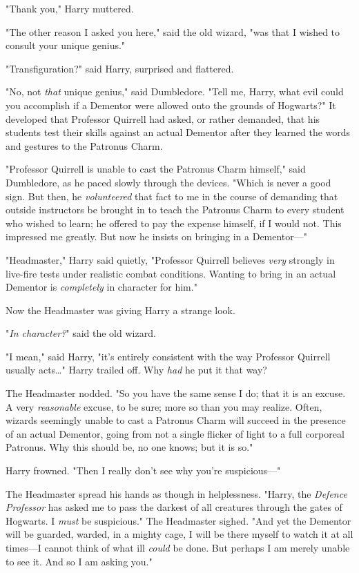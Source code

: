 "Thank you," Harry muttered.

"The other reason I asked you here," said the old wizard, "was that I wished to
consult your unique genius."

"Transfiguration?" said Harry, surprised and flattered.

"No, not \emph{that} unique genius," said Dumbledore. "Tell me, Harry, what
evil could you accomplish if a Dementor were allowed onto the grounds of
Hogwarts?"
\later
It developed that Professor Quirrell had asked, or rather demanded, that his
students test their skills against an actual Dementor after they learned the
words and gestures to the Patronus Charm.

"Professor Quirrell is unable to cast the Patronus Charm himself," said
Dumbledore, as he paced slowly through the devices. "Which is never a good
sign. But then, he \emph{volunteered} that fact to me in the course of
demanding that outside instructors be brought in to teach the Patronus Charm to
every student who wished to learn; he offered to pay the expense himself, if I
would not. This impressed me greatly. But now he insists on bringing in a
Dementor—"

"Headmaster," Harry said quietly, "Professor Quirrell believes \emph{very}
strongly in live-fire tests under realistic combat conditions. Wanting to bring
in an actual Dementor is \emph{completely} in character for him."

Now the Headmaster was giving Harry a strange look.

"\emph{In character?}" said the old wizard.

"I mean," said Harry, "it’s entirely consistent with the way Professor Quirrell
usually acts…" Harry trailed off. Why \emph{had} he put it that way?

The Headmaster nodded. "So you have the same sense I do; that it is an excuse.
A very \emph{reasonable} excuse, to be sure; more so than you may realize.
Often, wizards seemingly unable to cast a Patronus Charm will succeed in the
presence of an actual Dementor, going from not a single flicker of light to a
full corporeal Patronus. Why this should be, no one knows; but it is so."

Harry frowned. "Then I really don’t see why you’re suspicious—"

The Headmaster spread his hands as though in helplessness. "Harry, the
\emph{Defence Professor} has asked me to pass the darkest of all creatures
through the gates of Hogwarts. I \emph{must} be suspicious." The Headmaster
sighed. "And yet the Dementor will be guarded, warded, in a mighty cage, I will
be there myself to watch it at all times—I cannot think of what ill
\emph{could} be done. But perhaps I am merely unable to see it. And so I am
asking you."

